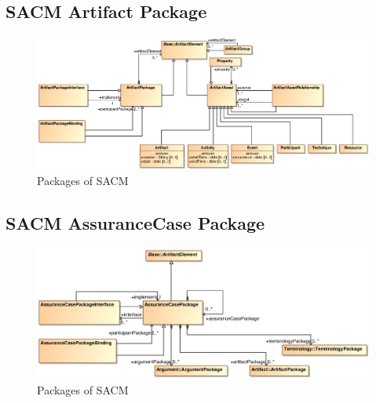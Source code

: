 \subsection{SACM Artifact Package}
\label{sec:artiPack}

\begin{figure}
	\centering
	\includegraphics[width=1\linewidth]{fig/Artifact.eps}
	\caption{Packages of SACM}
	\label{fig:arti}
\end{figure}
\subsection{SACM AssuranceCase Package}
\label{sec:acPack}

\begin{figure}
	\centering
	\includegraphics[width=1\linewidth]{fig/AssuranceCase.eps}
	\caption{Packages of SACM}
	\label{fig:ac}
\end{figure}